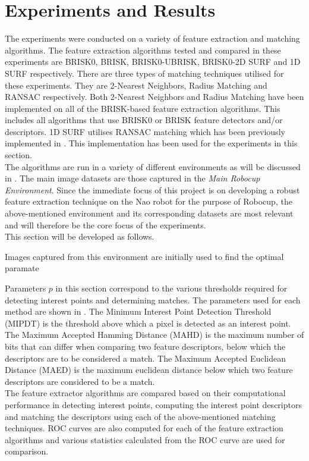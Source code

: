 \documentclass{report}
\begin{document}
\chapter{Experiments and Results}
\label{sec:experimentsResults}
The experiments were conducted on a variety of feature extraction and matching algorithms. The feature extraction algorithms tested and compared in these experiments are BRISK0, BRISK, BRISK0-UBRISK, BRISK0-2D SURF and 1D SURF respectively. There are three types of matching techniques utilised for these experiments. They are 2-Nearest Neighbors, Radius Matching and RANSAC respectively. Both 2-Nearest Neighbors and Radius Matching have been implemented on all of the BRISK-based feature extraction algorithms. This includes all algorithms that use BRISK0 or BRISK feature detectors and/or descriptors. 1D SURF utilises RANSAC matching which has been previously implemented in \cite{Anderson}. This implementation has been used for the experiments in this section.\\ 

The algorithms are run in a variety of different environments as will be discussed in . The main image datasets are those captured in the \textit{Main Robocup Environment}. Since the immediate focus of this project is on developing a robust feature extraction technique on the Nao robot for the purpose of Robocup, the above-mentioned environment  and its corresponding datasets are most relevant and will therefore be the core focus of the experiments.\\

This section will be developed as follows.

 Images captured from this environment are initially used to find the optimal paramate

Parameters $p$ in this section correspond to the various thresholds required for detecting interest points and determining matches. The parameters used for each method are shown in . The Minimum Interest Point Detection Threshold (MIPDT) is the threshold above which a pixel is detected as an interest point. The Maximum Accepted Hamming Distance (MAHD) is the maximum number of bits that can differ when comparing two feature descriptors, below which the descriptors are to be considered a match. The Maximum Accepted Euclidean Distance (MAED) is the maximum euclidean distance below which two feature descriptors are considered to be a match.\\

The feature extractor algorithms are compared based on their computational performance in detecting interest points, computing the interest point descriptors and matching the descriptors using each of the above-mentioned matching techniques. ROC curves are also computed for each of the feature extraction algorithms and various statistics calculated from the ROC curve are used for comparison. \\
\end{document}
